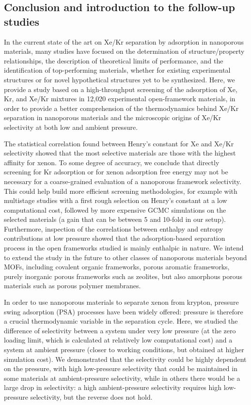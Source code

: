 \documentclass[main.tex]{subfiles}
\begin{document}
\subsection{Conclusion and introduction to the follow-up studies}

In the current state of the art on Xe/Kr separation by adsorption in nanoporous materials, many studies have focused on the determination of structure/property relationships, the description of theoretical limits of performance, and the identification of top-performing materials, whether for existing experimental structures or for novel hypothetical structures yet to be synthesized. Here, we provide a study based on a high-throughput screening of the adsorption of Xe, Kr, and Xe/Kr mixtures in 12,020 experimental open-framework materials, in order to provide a better comprehension of the thermodynamics behind Xe/Kr separation in nanoporous materials and the microscopic origins of Xe/Kr selectivity at both low and ambient pressure. 

The statistical correlation found between Henry's constant for Xe and Xe/Kr selectivity showed that the most selective materials are those with the highest affinity for xenon. To some degree of accuracy, we conclude that directly screening for Kr adsorption or for  xenon adsorption free energy may not be necessary for a coarse-grained evaluation of a nanoporous framework selectivity. This could help build more efficient screening methodologies, for example with multistage studies with a first rough selection on Henry's constant at a low computational cost, followed by more expensive GCMC simulations on the selected materials (a gain that can be between 5 and 10-fold in our setup). Furthermore, inspection of the correlations between enthalpy and entropy contributions at low pressure showed that the adsorption-based separation process in the open frameworks studied is mainly enthalpic in nature. We intend to extend the study in the future to other classes of nanoporous materials beyond MOFs, including covalent organic frameworks, porous aromatic frameworks, purely inorganic porous frameworks such as zeolites, but also amorphous porous materials such as porous polymer membranes.

In order to use nanoporous materials to separate xenon from krypton, pressure swing adsorption (PSA) processes have been widely offered: pressure is therefore a crucial thermodynamic variable in the separation cycle. Here, we studied the difference of selectivity between a system under very low pressure (at the zero loading limit, which is calculated at relatively low computational cost) and a system at ambient pressure (closer to working conditions, but obtained at higher simulation cost). We demonstrated that the selectivity could be highly dependent on the pressure, with high low-pressure selectivity that could be maintained in some materials at ambient-pressure selectivity, while in others there would be a large drop in selectivity: a high ambient-pressure selectivity requires high low-pressure selectivity, but the reverse does not hold.
\end{document}
